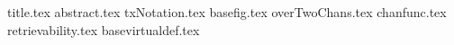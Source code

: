 \documentclass{llncs}
\begin{document}
\pagestyle{plain}
{title.tex}
{abstract.tex}
{txNotation.tex}
{basefig.tex}
{overTwoChans.tex}
{chanfunc.tex}
{retrievability.tex}
{basevirtualdef.tex}

\end{document}
